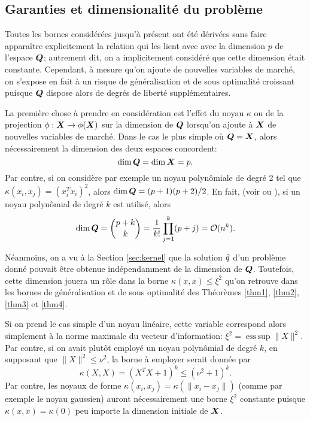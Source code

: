 \subsection{Garanties et dimensionalité du problème}
\label{b:dim}

Toutes les bornes considérées jusqu'à présent ont été dérivées sans faire apparaître
explicitement la relation qui les lient avec avec la dimension $p$ de l'espace $\bm Q$;
autrement dit, on a implicitement considéré que cette dimension était
constante. Cependant, à mesure qu'on ajoute de nouvelles variables de marché, on s'expose
en fait à un risque de généralisation et de sous optimalité croissant puisque $\bm Q$ dispose
alors de degrés de liberté supplémentaires.

La première chose à prendre en considération est l'effet du noyau $\kappa$ ou de la projection
$\phi:\bm{X}\to\phi(\bm{X})$ sur la dimension de $\bm Q$ lorsqu'on ajoute à $\bm{X}$ de nouvelles variables de
marché. Dans le cas le plus simple où $\bm Q = \bm{X}$, alors nécessairement la dimension des
deux espaces concordent:
\begin{equation}
  \dim\bm Q = \dim\bm{X} = p.
\end{equation}
Par contre, si on considère par exemple un noyau polynômiale de degré 2 tel que
$\kappa(x_i,x_j) = (x_i^Tx_i)^2$, alors $\dim\bm Q = (p+1)(p+2)/2$. En fait, (voir
\cite{mohri2012foundations} ou \cite{bishop2006pattern}), si un noyau polynômial de degré
$k$ est utilisé, alors
\begin{equation}
  \dim\bm Q = \binom{p+k}{k} = \frac{1}{k!}\prod_{j=1}^k(p+j) = \mathcal O(n^k).
\end{equation}

Néanmoins, on a vu à la Section \ref{sec:kernel} que la solution $\hat q$ d'un problème donné
pouvait être obtenue indépendamment de la dimension de $\bm Q$. Toutefois, cette dimension
jouera un rôle dans la borne $\kappa(x,x) \leq \xi^2$ qu'on retrouve dans les bornes de
généralisation et de sous optimalité des Théorèmes \ref{thm1}, \ref{thm2}, \ref{thm3} et
\ref{thm4}.

Si on prend le cas simple d'un noyau linéaire, cette variable correspond alors simplement
à la norme maximale du vecteur d'information: $\xi^2 = \operatorname{ess\,sup}\|X\|^2$.  Par contre, si on
avait plutôt employé un noyau polynômial de degré $k$, en supposant que $\|X\|^2 \leq \nu^2$, la
borne à employer serait donnée par
\begin{equation}
\kappa(X,X) = (X^TX + 1)^k \leq (\nu^2 + 1)^k.
\end{equation}
Par contre, les noyaux de forme $\kappa(x_i,x_j) = \kappa(\|x_i - x_j\|)$ (comme par exemple le
noyau gaussien) auront nécessairement une borne $\xi^2$ constante puisque
$\kappa(x,x) = \kappa(0)$ peu importe la dimension initiale de $\bm{X}$.


